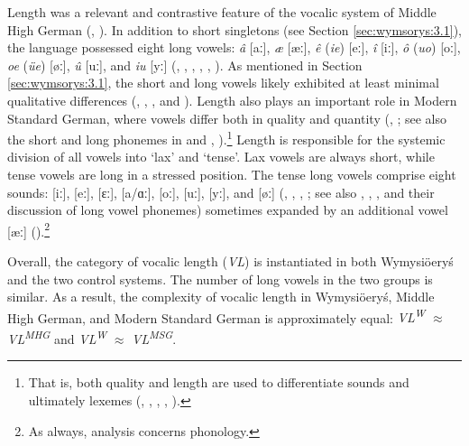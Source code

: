 \documentclass[output=paper,hidelinks]{langscibook}
\begin{document}
Length was a relevant and contrastive feature of the vocalic system of Middle High German (\citealt[1133]{simmler_phonetik_1985}, \citealt{Seiler2005}). In addition to short singletons (see Section \ref{sec:wymsorys:3.1}), the language possessed eight long vowels: \textit{â} [aː], \textit{æ} [æː], \textit{ê} (\textit{ie}) [eː], \textit{î} [iː], \textit{ô} (\textit{uo}) [oː], \textit{oe} (\textit{üe}) [øː], \textit{û} [uː], and \textit{iu} [yː] (\citealt[2--7]{wright_middle_1917}, \citealt[37--38, 41]{de_boor_mittelhochdeutsche_1973}, \citealt[1133]{simmler_phonetik_1985}, \citealt[62--63, 97--100]{paul_mittelhochdeutsche_2007}, \citealt[9]{hall_underlying_2017}, \citealt[69]{schmidt_einfuhrung_2017}). As mentioned in Section \ref{sec:wymsorys:3.1}, the short and long vowels likely exhibited at least minimal qualitative differences (\citealt[3]{wright_middle_1917}, \citealt[185]{caratini_vocalic_2009}, \citealt[9]{hall_underlying_2017}, and \citealt[69]{schmidt_einfuhrung_2017}). Length also plays an important role in Modern Standard German, where vowels differ both in quality and quantity (\citealt[7--9]{fagan_german_2009}, \citealt[17, 19]{obrein_german_2016}; see also the short and long phonemes in \citealt[118--119]{russ_german_1994} and \citealt{wiese_phonology_1996}, \citealt[39--41]{fox_structure_2005}).\footnote{That is, both quality and length are used to differentiate sounds and ultimately lexemes (\citealt[352]{eisenberg_german_1994}, \citealt[3]{dodd_modern_2003}, \citealt[109]{johnson_exploring_2008}, \citealt[7--9]{fagan_german_2009}, \citealt[17--19]{obrein_german_2016}).} Length is responsible for the systemic division of all vowels into `lax' and `tense'. Lax vowels are always short, while tense vowels are long in a stressed position. The tense long vowels comprise eight sounds: [iː], [eː], [ɛː], [a/ɑː], [oː], [uː], [yː], and [øː] (\citealt[350--352]{eisenberg_german_1994}, \citealt[109--110]{johnson_exploring_2008}, \citealt[7--9]{fagan_german_2009}, \citealt[17, 19]{obrein_german_2016}; see also \citealt[118--119]{russ_german_1994}, \citealt[19--21]{wiese_phonology_1996}, \citealt[38--39, 41]{fox_structure_2005}, and their discussion of long vowel phonemes) sometimes expanded by an additional vowel [æː] (\citealt[35--36, 38]{fox_structure_2005}).\footnote{As always,  analysis concerns phonology.}



Overall, the category of vocalic length (\textit{VL}) is instantiated in both Wymysiöeryś and the two control systems. The number of long vowels in the two groups is similar. As a result, the complexity of vocalic length in Wymysiöeryś, Middle High German, and Modern Standard German is approximately equal: \textit{VL\textsuperscript{W}} ${\approx}$ \textit{VL\textsuperscript{MHG} }and \textit{VL\textsuperscript{W}} ${\approx}$ \textit{VL\textsuperscript{MSG}}.
\end{document}
